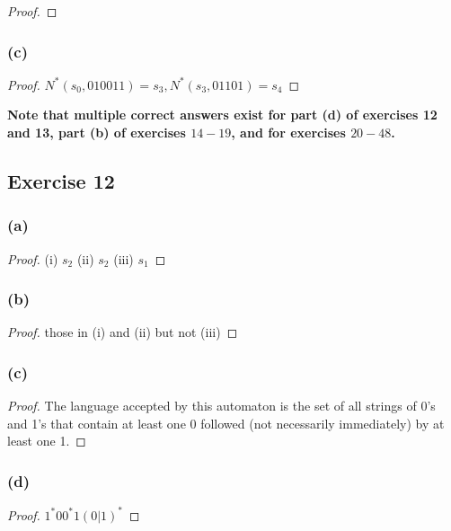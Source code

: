 \documentclass[14pt]{extarticle}
\newcommand{\cy}{\color{cyan}}
\begin{document}
\begin{proof}

\end{proof}

\subsubsection{(c)}

\begin{proof}
\(N^*(s_0, 010011) = s_3, N^*(s_3, 01101) = s_4\)
\end{proof}

{\bf \cy Note that multiple correct answers exist for part (d) of exercises 12 and 13, part (b) of exercises \(14-19\), and 
for exercises \(20-48\).}

\subsection{Exercise 12}

\subsubsection{(a)}

\begin{proof}
(i) \(s_2\) (ii) \(s_2\) (iii) \(s_1\)
\end{proof}

\subsubsection{(b)}

\begin{proof}
those in (i) and (ii) but not (iii)
\end{proof}

\subsubsection{(c)}

\begin{proof}
The language accepted by this automaton is the set of all strings of 0’s and 1’s that contain at least one 0 followed 
(not necessarily immediately) by at least one 1.
\end{proof}

\subsubsection{(d)}

\begin{proof}
\(1^*00^*1(0 | 1)^*\)
\end{proof}
\end{document}
